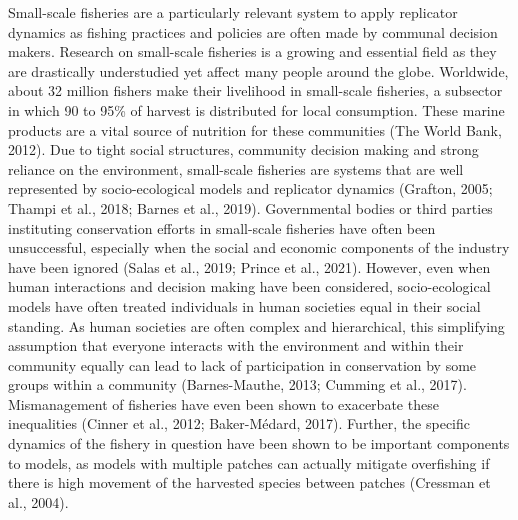 \documentclass[
  12pt,
]{article}
\begin{document}
Small-scale fisheries are a particularly relevant system to apply replicator dynamics as fishing practices and policies are often made by communal decision makers. Research on small-scale fisheries is a growing and essential field as they are drastically understudied yet affect many people around the globe. Worldwide, about 32 million fishers make their livelihood in small-scale fisheries, a subsector in which 90 to 95\% of harvest is distributed for local consumption. These marine products are a vital source of nutrition for these communities (The World Bank, 2012). Due to tight social structures, community decision making and strong reliance on the environment, small-scale fisheries are systems that are well represented by socio-ecological models and replicator dynamics (Grafton, 2005; Thampi et al., 2018; Barnes et al., 2019). Governmental bodies or third parties instituting conservation efforts in small-scale fisheries have often been unsuccessful, especially when the social and economic components of the industry have been ignored (Salas et al., 2019; Prince et al., 2021). However, even when human interactions and decision making have been considered, socio-ecological models have often treated individuals in human societies equal in their social standing. As human societies are often complex and hierarchical, this simplifying assumption that everyone interacts with the environment and within their community equally can lead to lack of participation in conservation by some groups within a community (Barnes-Mauthe, 2013; Cumming et al., 2017). Mismanagement of fisheries have even been shown to exacerbate these inequalities (Cinner et al., 2012; Baker-Médard, 2017). Further, the specific dynamics of the fishery in question have been shown to be important components to models, as models with multiple patches can actually mitigate overfishing if there is high movement of the harvested species between patches (Cressman et al., 2004).
\end{document}
